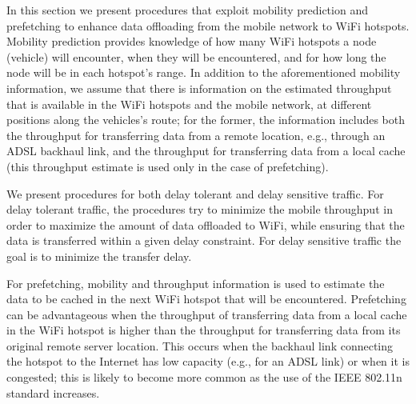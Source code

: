 \documentclass{sig-alternate}
\newcommand{\mynotex}[1]{}
\begin{document}
In this section we present procedures that exploit mobility prediction and prefetching to enhance data offloading from the mobile network to WiFi hotspots. Mobility prediction provides knowledge of how many WiFi hotspots a node (vehicle) will encounter, when they will be encountered, and for how long the node will be in each hotspot's range. In addition to the aforementioned mobility information, we assume that there is information on the estimated throughput that is available in the WiFi hotspots and the mobile network, at different positions along the vehicles's route; for the former, the information includes both the throughput for transferring data from a remote location, e.g., through an ADSL backhaul link, and the throughput for transferring data from a local cache (this throughput estimate is used only in the case of prefetching).

We present procedures for both delay tolerant and delay sensitive traffic. For delay tolerant traffic, the  procedures try to minimize the mobile  throughput  in order to maximize the amount of data offloaded to WiFi, while ensuring that the data is transferred within a given delay constraint.
For delay sensitive traffic the goal is to minimize the transfer delay.



For prefetching, mobility and throughput information is used to estimate the  data to be cached in the next WiFi hotspot that will be encountered.
Prefetching can be advantageous when the throughput of transferring data from a local cache in the WiFi hotspot is higher than the throughput for transferring data from its original remote server location. This occurs when the backhaul link connecting the hotspot to the Internet has low capacity (e.g., for an ADSL link) or when it is congested; this is likely to become more common as the use of the IEEE 802.11n standard increases.


\mynotex{
\begin{itemize}
\item Common feature of both is prefetching, which involves estimating the amount of cached data and the offset within the data object from which to cache.
\item Different is that in the case of delay tolerant traffic, there is a delay threshold within which the data object needs to be transferred. Hence, we try to minimize the throughput of the mobile network. On the other hand, in the case of delay sensitive traffic we use the maximum throughput of the mobile network.
\end{itemize}
}
\end{document}
